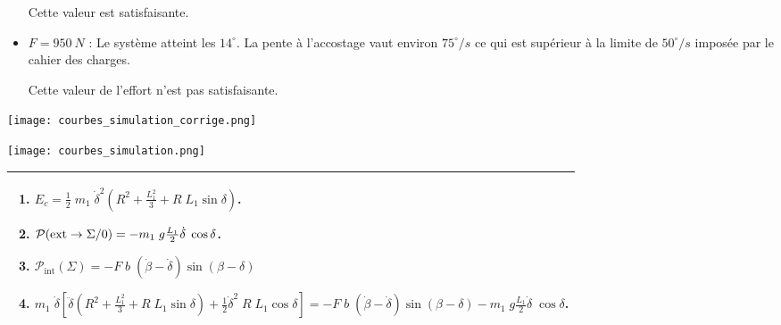 \begin{multicols}{2}
\begin{corrige}
\begin{itemize}
Cette valeur est satisfaisante.

\item \textbf{$F=\SI{950}{N}$} : Le système atteint les $14^{\circ}$. La pente à l'accostage vaut environ $75^{\circ}/s$ ce
qui est supérieur à la limite de $50^{\circ}/s$ imposée par le cahier des
charges.

Cette valeur de l'effort n'est pas satisfaisante.
\end{itemize}

\begin{center}
\texttt{[image: courbes\_simulation\_corrige.png]}
\end{center}

\end{corrige}
\else
\fi

\ifprof
\else

\begin{center}
\texttt{[image: courbes\_simulation.png]}
\end{center}
\fi

\ifprof
\else
\ifcolle
\else
\noindent
\begin{tabular}{|p{\linewidth}|}
\hline
\begin{enumerate}
\item  $E_c=\frac{1}{2}\;m_1\;\dot{\delta}^2\left(R^2+\frac{L_1^2}{3}+R\;L_1\sin\delta\right)$.
\item  $ \mathcal{P}(\text{\text{ext}}\rightarrow \Sigma/0)= -m_1\;g\frac{L_1}{2}\dot{\delta}\;\cos\delta $.
\item  $ \mathcal{P}_{\text{int}}\left( \Sigma\right)=-F\;b\;\left(\dot{\beta}-\dot{\delta}\right)\sin(\beta-\delta) $
\item $m_1\;\dot{\delta}\left[\ddot{\delta}\left(R^2+\frac{L_1^2}{3}+R\;L_1\sin\delta\right)+\frac{1}{2}\dot{\delta}^2\;R\;L_1\cos\delta\right]
=-F\;b\;\left(\dot{\beta}-\dot{\delta}\right)\sin(\beta-\delta)-m_1\;g\frac{L_1}{2}\dot{\delta}\;\cos\delta $.
\end{enumerate} \\
\hline
\end{tabular}
\fi

\fi



\ifprof
\else
\end{multicols}%
\fi

